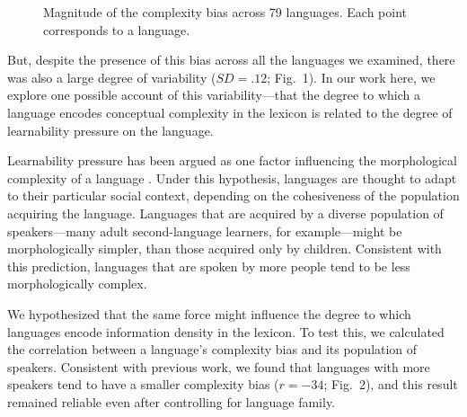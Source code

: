 \documentclass{evolang11}
\begin{document}
\begin{figure}[hb]
\begin{center}
\end{center}
\caption{Magnitude of the complexity bias across 79 languages. Each point corresponds to a language. \label{fig1}}
\end{figure}

But, despite the presence of this bias across all the languages we examined, there was also a large degree of variability ($SD = .12$;  Fig.\ 1). In our work here, we explore one possible account of this variability---that the degree to which a language encodes conceptual complexity in the lexicon is related to the degree of learnability pressure on the language.

Learnability pressure has been argued as one factor influencing the morphological complexity of a language \cite{lupyan2010language}. Under this hypothesis, languages are thought to adapt to their particular social context, depending on the cohesiveness of the population acquiring the language. Languages that are  acquired by a diverse population of speakers---many  adult second-language learners, for example---might be morphologically simpler, than those acquired only by children. Consistent with this prediction, languages that are spoken by more people tend to be less morphologically complex.

We hypothesized that the same force might influence the degree to which languages encode information density in the lexicon. To test this, we calculated the correlation between a language's complexity bias and its population of speakers. Consistent with previous work, we found that languages with more speakers tend to have a smaller complexity bias ($r = -34$;  Fig.\ 2), and this result remained reliable even after controlling for language family.
\end{document}
